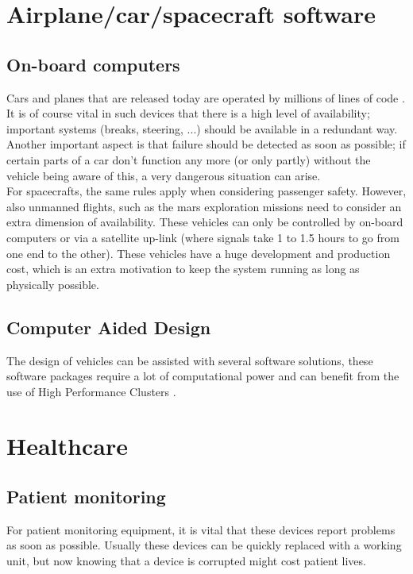 \documentclass[12pt]{report}
\begin{document}
\section{Airplane/car/spacecraft software}
\subsection{On-board computers}
Cars and planes that are released today are operated by millions of lines of code
\cite{ieee_cars_and_planes}. It is of course vital in such devices
that there is a high level of availability; important systems (breaks,
steering, ...) should be available in a redundant way. \\
Another important aspect is that failure should be detected as soon as
possible; if certain parts of a car don't function any more (or only
partly) without the vehicle being aware of this, a very dangerous
situation can arise.\\
For spacecrafts, the same rules apply when considering passenger
safety. However, also unmanned flights, such as the mars exploration missions
need to consider an extra dimension of availability. These vehicles
can only be controlled by on-board computers or via a satellite
up-link (where signals take 1 to 1.5 hours \cite{mars_rover} to go
from one end to the other). These vehicles have a
huge development and production cost, which is an extra motivation to
 keep the system running as long as physically possible.
\subsection{Computer Aided Design}
The design of vehicles can be assisted with several software
solutions, these software packages require a lot of computational
power and can benefit from the use of High Performance Clusters
\cite{hpc_cars}.

\section{Healthcare}
\subsection{Patient monitoring}
For patient monitoring equipment, it is vital that these devices
report problems as soon as possible. Usually these devices can be
quickly replaced with a working unit, but now knowing that a device is
corrupted might cost patient lives.\\
\end{document}
